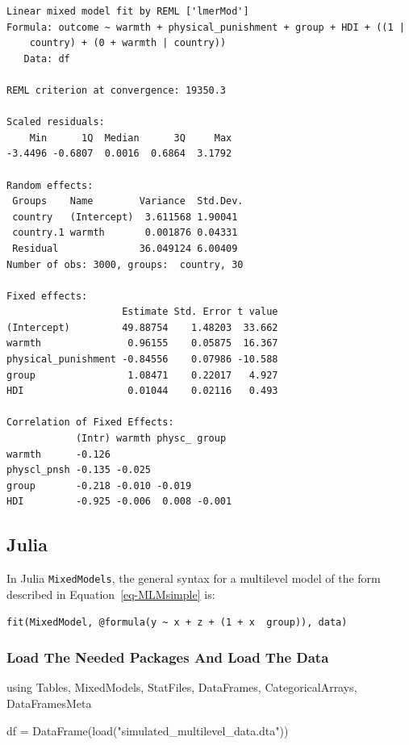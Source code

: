 \documentclass[
  letterpaper,
  DIV=11,
  numbers=noendperiod]{scrreprt}
\newenvironment{Shaded}{\begin{snugshade}}{\end{snugshade}}
\newcommand{\BuiltInTok}[1]{\textcolor[rgb]{0.00,0.23,0.31}{#1}}
\newcommand{\FunctionTok}[1]{\textcolor[rgb]{0.28,0.35,0.67}{#1}}
\newcommand{\ImportTok}[1]{\textcolor[rgb]{0.00,0.46,0.62}{#1}}
\newcommand{\NormalTok}[1]{\textcolor[rgb]{0.00,0.23,0.31}{#1}}
\newcommand{\OperatorTok}[1]{\textcolor[rgb]{0.37,0.37,0.37}{#1}}
\newcommand{\StringTok}[1]{\textcolor[rgb]{0.13,0.47,0.30}{#1}}
\begin{document}
\begin{verbatim}
Linear mixed model fit by REML ['lmerMod']
Formula: outcome ~ warmth + physical_punishment + group + HDI + ((1 |  
    country) + (0 + warmth | country))
   Data: df

REML criterion at convergence: 19350.3

Scaled residuals: 
    Min      1Q  Median      3Q     Max 
-3.4496 -0.6807  0.0016  0.6864  3.1792 

Random effects:
 Groups    Name        Variance  Std.Dev.
 country   (Intercept)  3.611568 1.90041 
 country.1 warmth       0.001876 0.04331 
 Residual              36.049124 6.00409 
Number of obs: 3000, groups:  country, 30

Fixed effects:
                    Estimate Std. Error t value
(Intercept)         49.88754    1.48203  33.662
warmth               0.96155    0.05875  16.367
physical_punishment -0.84556    0.07986 -10.588
group                1.08471    0.22017   4.927
HDI                  0.01044    0.02116   0.493

Correlation of Fixed Effects:
            (Intr) warmth physc_ group 
warmth      -0.126                     
physcl_pnsh -0.135 -0.025              
group       -0.218 -0.010 -0.019       
HDI         -0.925 -0.006  0.008 -0.001
\end{verbatim}

\subsection{Julia}

In Julia \texttt{MixedModels}, the general syntax for a multilevel model
of the form described in Equation~\ref{eq-MLMsimple} is:

\texttt{fit(MixedModel,\ @formula(y\ \textasciitilde{}\ x\ +\ z\ +\ (1\ +\ x\ \textbar{}\ group)),\ data)}

\hypertarget{load-the-needed-packages-and-load-the-data}{%
\subsubsection{Load The Needed Packages And Load The
Data}\label{load-the-needed-packages-and-load-the-data}}

\begin{Shaded}
\begin{Highlighting}[]
\ImportTok{using} \BuiltInTok{Tables}\NormalTok{, }\BuiltInTok{MixedModels}\NormalTok{, }\BuiltInTok{StatFiles}\NormalTok{, }\BuiltInTok{DataFrames}\NormalTok{, }\BuiltInTok{CategoricalArrays}\NormalTok{, }\BuiltInTok{DataFramesMeta}

\NormalTok{df }\OperatorTok{=} \FunctionTok{DataFrame}\NormalTok{(}\FunctionTok{load}\NormalTok{(}\StringTok{"simulated\_multilevel\_data.dta"}\NormalTok{))}
\end{Highlighting}
\end{Shaded}
\end{document}
